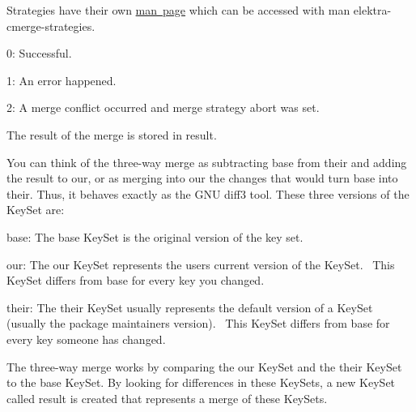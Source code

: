 Strategies have their own \mbox{\hyperlink{doc_help_elektra-cmerge-strategy_md}{man page}} which can be accessed with {\ttfamily man elektra-\/cmerge-\/strategies}.


\begin{DoxyItemize}
\item 0\+: Successful.
\item 1\+: An error happened.
\item 2\+: A merge conflict occurred and merge strategy abort was set.
\end{DoxyItemize}

The result of the merge is stored in {\ttfamily result}.

You can think of the three-\/way merge as subtracting base from their and adding the result to our, or as merging into our the changes that would turn base into their. Thus, it behaves exactly as the G\+NU diff3 tool. These three versions of the Key\+Set are\+:~\newline



\begin{DoxyItemize}
\item {\ttfamily base}\+: The {\ttfamily base} Key\+Set is the original version of the key set.~\newline

\item {\ttfamily our}\+: The {\ttfamily our} Key\+Set represents the user\textquotesingle{}s current version of the Key\+Set.~\newline
 This Key\+Set differs from {\ttfamily base} for every key you changed.~\newline

\item {\ttfamily their}\+: The {\ttfamily their} Key\+Set usually represents the default version of a Key\+Set (usually the package maintainer\textquotesingle{}s version).~\newline
 This Key\+Set differs from {\ttfamily base} for every key someone has changed.~\newline

\end{DoxyItemize}

The three-\/way merge works by comparing the {\ttfamily our} Key\+Set and the {\ttfamily their} Key\+Set to the {\ttfamily base} Key\+Set. By looking for differences in these Key\+Sets, a new Key\+Set called {\ttfamily result} is created that represents a merge of these Key\+Sets.~\newline


